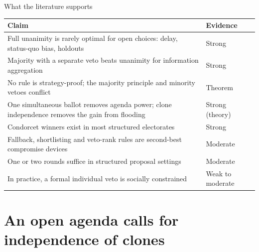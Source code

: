 \documentclass[10pt,aspectratio=169]{beamer}
\begin{document}
\begin{frame}{What the literature supports}
  \footnotesize
  \begin{tabular}{>{\raggedright\arraybackslash}p{} l}
    \toprule
    Claim & Evidence \\
    \midrule
    Full unanimity is rarely optimal for open choices: delay, status-quo bias, holdouts & Strong \\
    Majority with a separate veto beats unanimity for information aggregation & Strong \\
    No rule is strategy-proof; the majority principle and minority vetoes conflict & Theorem \\
    One simultaneous ballot removes agenda power; clone independence removes the gain from flooding
      & Strong (theory) \\
    Condorcet winners exist in most structured electorates & Strong \\
    Fallback, shortlisting and veto-rank rules are second-best compromise devices & Moderate \\
    One or two rounds suffice in structured proposal settings & Moderate \\
    In practice, a formal individual veto is socially constrained & Weak to moderate \\
    \bottomrule
  \end{tabular}
  \medskip

\end{frame}

\section{An open agenda calls for independence of clones}
\end{document}
